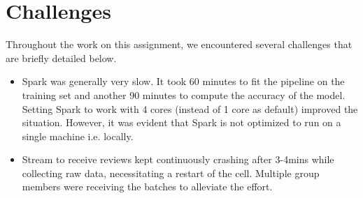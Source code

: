 \documentclass[11pt, oneside]{article}   	%
\begin{document}
	\section{Challenges}
	
	Throughout the work on this assignment, we encountered several challenges that are briefly detailed below.
	\begin{itemize}
		
		\item Spark was generally very slow. It took 60 minutes to fit the pipeline on the training set and another 90 minutes to compute the accuracy of the model. Setting Spark to work with 4 cores (instead of 1 core as default) improved the situation. However, it was evident that Spark is not optimized to run on a single machine i.e. locally.
		\item Stream to receive reviews kept continuously crashing after 3-4mins while collecting raw data, necessitating a restart of the cell. Multiple group members were receiving the batches to alleviate the effort.
		
	\end{itemize}
	
\end{document}

